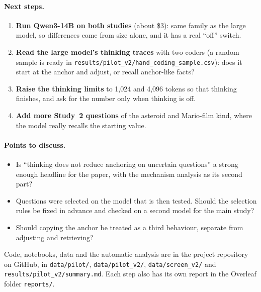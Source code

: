 \documentclass[11pt,a4paper]{article}
\begin{document}
\paragraph{Next steps.}
\begin{enumerate}[leftmargin=*]
  \item \textbf{Run Qwen3-14B on both studies} (about \$3): same family as the large model, so differences come from size alone, and it has a real \enquote{off} switch.
  \item \textbf{Read the large model's thinking traces} with two coders (a random sample is ready in \texttt{results/pilot\_v2/hand\_coding\_sample.csv}): does it start at the anchor and adjust, or recall anchor-like facts?
  \item \textbf{Raise the thinking limits} to 1,024 and 4,096 tokens so that thinking finishes, and ask for the number only when thinking is off.
  \item \textbf{Add more Study~2 questions} of the asteroid and Mario-film kind, where the model really recalls the starting value.
\end{enumerate}

\paragraph{Points to discuss.}
\begin{itemize}[leftmargin=*]
  \item Is \enquote{thinking does not reduce anchoring on uncertain questions} a strong enough headline for the paper, with the mechanism analysis as its second part?
  \item Questions were selected on the model that is then tested. Should the selection rules be fixed in advance and checked on a second model for the main study?
  \item Should copying the anchor be treated as a third behaviour, separate from adjusting and retrieving?
\end{itemize}

Code, notebooks, data and the automatic analysis are in the project repository on GitHub, in \texttt{data/pilot/}, \texttt{data/pilot\_v2/}, \texttt{data/screen\_v2/} and \texttt{results/pilot\_v2/summary.md}. Each step also has its own report in the Overleaf folder \texttt{reports/}.



\end{document}
